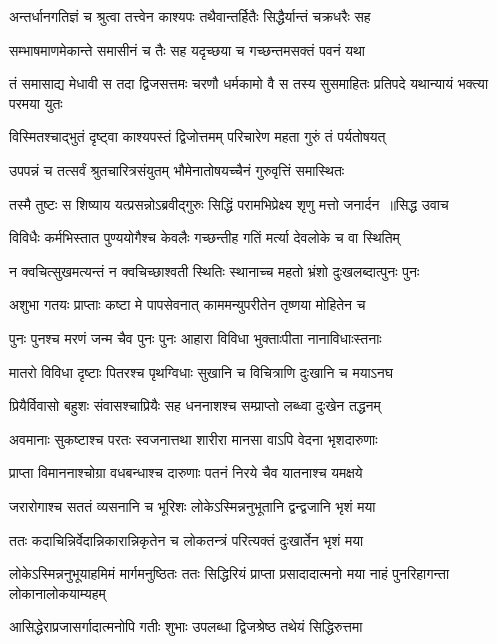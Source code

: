 \twolineshloka
{अन्तर्धानगतिज्ञं च श्रुत्वा तत्त्वेन काश्यपः}
{तथैवान्तर्हितैः सिद्धैर्यान्तं चक्रधरैः सह}


\twolineshloka
{सम्भाषमाणमेकान्ते समासीनं च तैः सह}
{यदृच्छया च गच्छन्तमसक्तं पवनं यथा}


\threelineshloka
{तं समासाद्य मेधावी स तदा द्विजसत्तमः}
{चरणौ धर्मकामो वै स तस्य सुसमाहितः}
{प्रतिपदे यथान्यायं भक्त्या परमया युतः}


\twolineshloka
{विस्मितश्चाद्भुतं दृष्ट्वा काश्यपस्तं द्विजोत्तमम्}
{परिचारेण महता गुरुं तं पर्यतोषयत्}


\twolineshloka
{उपपन्नं च तत्सर्वं श्रुतचारित्रसंयुतम्}
{भौमेनातोषयच्चैनं गुरुवृत्तिं समास्थितः}


\threelineshloka
{तस्मै तुष्टः स शिष्याय यत्प्रसन्नोऽब्रवीद्गुरुः}
{सिद्धिं परामभिप्रेक्ष्य शृणु मत्तो जनार्दन ॥सिद्ध उवाच}
{}


\twolineshloka
{विविधैः कर्मभिस्तात पुण्ययोगैश्च केवलैः}
{गच्छन्तीह गतिं मर्त्या देवलोके च वा स्थितिम्}


\twolineshloka
{न क्वचित्सुखमत्यन्तं न क्वचिच्छाश्वती स्थितिः}
{स्थानाच्च महतो भ्रंशो दुःखलब्दात्पुनः पुनः}


\twolineshloka
{अशुभा गतयः प्राप्ताः कष्टा मे पापसेवनात्}
{काममन्युपरीतेन तृष्णया मोहितेन च}


\twolineshloka
{पुनः पुनश्च मरणं जन्म चैव पुनः पुनः}
{आहारा विविधा भुक्ताःपीता नानाविधाःस्तनाः}


\twolineshloka
{मातरो विविधा दृष्टाः पितरश्च पृथग्विधाः}
{सुखानि च विचित्राणि दुःखानि च मयाऽनघ}


\twolineshloka
{प्रियैर्विवासो बहुशः संवासश्चाप्रियैः सह}
{धननाशश्च सम्प्राप्तो लब्ध्वा दुःखेन तद्धनम्}


\twolineshloka
{अवमानाः सुकष्टाश्च परतः स्वजनात्तथा}
{शारीरा मानसा वाऽपि वेदना भृशदारुणाः}


\twolineshloka
{प्राप्ता विमाननाश्चोग्रा वधबन्धाश्च दारुणाः}
{पतनं निरये चैव यातनाश्च यमक्षये}


\twolineshloka
{जरारोगाश्च सततं व्यसनानि च भूरिशः}
{लोकेऽस्मिन्ननुभूतानि द्वन्द्वजानि भृशं मया}


\twolineshloka
{ततः कदाचिन्निर्वेदान्निकारान्निकृतेन च}
{लोकतन्त्रं परित्यक्तं दुःखार्तेन भृशं मया}


\threelineshloka
{लोकेऽस्मिन्ननुभूयाहमिमं मार्गमनुष्ठितः}
{ततः सिद्धिरियं प्राप्ता प्रसादादात्मनो मया}
{नाहं पुनरिहागन्ता लोकानालोकयाम्यहम्}


\twolineshloka
{आसिद्धेराप्रजासर्गादात्मनोपि गतीः शुभाः}
{उपलब्धा द्विजश्रेष्ठ तथेयं सिद्धिरुत्तमा}


